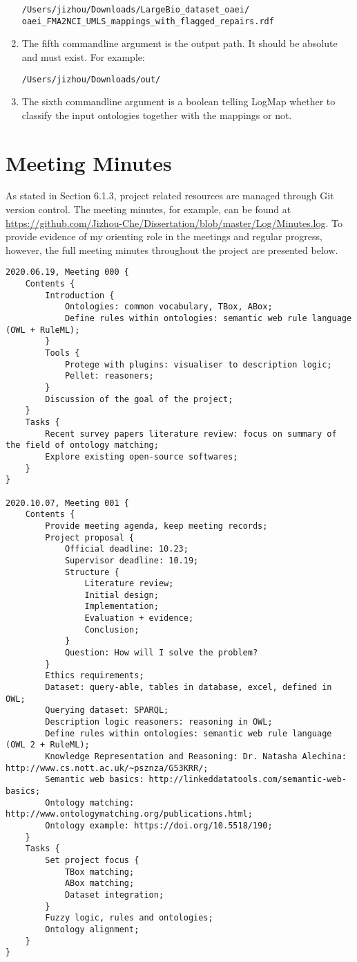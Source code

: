 \begin{appendices}
\begin{enumerate}
  \texttt{/Users/jizhou/Downloads/LargeBio\_dataset\_oaei/\\oaei\_FMA2NCI\_UMLS\_mappings\_with\_flagged\_repairs.rdf}
\item
  The fifth commandline argument is the output path. It should be
  absolute and must exist. For example:

  \texttt{/Users/jizhou/Downloads/out/}
\item
  The sixth commandline argument is a boolean telling LogMap whether to
  classify the input ontologies together with the mappings or not.
\end{enumerate}


\chapter{Meeting Minutes}

As stated in Section 6.1.3, project related resources are managed through Git version control. The meeting minutes, for example, can be found at \url{https://github.com/Jizhou-Che/Dissertation/blob/master/Log/Minutes.log}. To provide evidence of my orienting role in the meetings and regular progress, however, the full meeting minutes throughout the project are presented below.
\\

\begin{spacing}{1.0}


\begin{lstlisting}
2020.06.19, Meeting 000 {
	Contents {
		Introduction {
			Ontologies: common vocabulary, TBox, ABox;
			Define rules within ontologies: semantic web rule language (OWL + RuleML);
		}
		Tools {
			Protege with plugins: visualiser to description logic;
			Pellet: reasoners;
		}
		Discussion of the goal of the project;
	}
	Tasks {
		Recent survey papers literature review: focus on summary of the field of ontology matching;
		Explore existing open-source softwares;
	}
}

2020.10.07, Meeting 001 {
	Contents {
		Provide meeting agenda, keep meeting records;
		Project proposal {
			Official deadline: 10.23;
			Supervisor deadline: 10.19;
			Structure {
				Literature review;
				Initial design;
				Implementation;
				Evaluation + evidence;
				Conclusion;
			}
			Question: How will I solve the problem?
		}
		Ethics requirements;
		Dataset: query-able, tables in database, excel, defined in OWL;
		Querying dataset: SPARQL;
		Description logic reasoners: reasoning in OWL;
		Define rules within ontologies: semantic web rule language (OWL 2 + RuleML);
		Knowledge Representation and Reasoning: Dr. Natasha Alechina: http://www.cs.nott.ac.uk/~psznza/G53KRR/;
		Semantic web basics: http://linkeddatatools.com/semantic-web-basics;
		Ontology matching: http://www.ontologymatching.org/publications.html;
		Ontology example: https://doi.org/10.5518/190;
	}
	Tasks {
		Set project focus {
			TBox matching;
			ABox matching;
			Dataset integration;
		}
		Fuzzy logic, rules and ontologies;
		Ontology alignment;
	}
}


\end{lstlisting}
\end{spacing}
\end{appendices}

